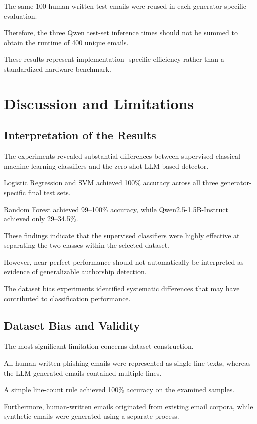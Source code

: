\documentclass[sigconf,nonacm]{acmart}
\begin{document}
The same 100 human-written test emails
were reused in each generator-specific
evaluation.

Therefore, the three Qwen test-set
inference times should not be summed
to obtain the runtime of 400 unique emails.

These results represent implementation-
specific efficiency rather than a
standardized hardware benchmark.

\section{Discussion and Limitations}

\subsection{Interpretation of the Results}

The experiments revealed substantial
differences between supervised classical
machine learning classifiers and the
zero-shot LLM-based detector.

Logistic Regression and SVM achieved
100\% accuracy across all three
generator-specific final test sets.

Random Forest achieved 99--100\%
accuracy, while Qwen2.5-1.5B-Instruct
achieved only 29--34.5\%.

These findings indicate that the
supervised classifiers were highly
effective at separating the two classes
within the selected dataset.

However, near-perfect performance should
not automatically be interpreted as
evidence of generalizable authorship
detection.

The dataset bias experiments identified
systematic differences that may have
contributed to classification performance.

\subsection{Dataset Bias and Validity}

The most significant limitation
concerns dataset construction.

All human-written phishing emails
were represented as single-line texts,
whereas the LLM-generated emails
contained multiple lines.

A simple line-count rule achieved
100\% accuracy on the examined samples.

Furthermore, human-written emails
originated from existing email corpora,
while synthetic emails were generated
using a separate process.
\end{document}
